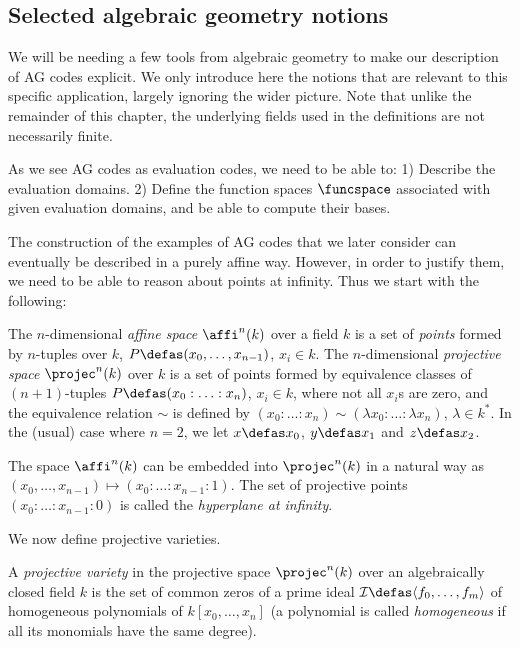 \subsection{Selected algebraic geometry notions}

We will be needing a few tools from algebraic geometry to make our description of AG codes explicit. We only introduce
here the notions that are relevant to this specific application,
largely ignoring the wider picture. Note that unlike the remainder of this chapter, the underlying fields used in the definitions
are not necessarily finite.

As we see AG codes as evaluation codes, we need to be able to: 1) Describe the evaluation domains.
2) Define the function spaces $\funcspace$ associated with given evaluation domains,
and be able to compute their bases.

\medskip

The construction of the examples of AG codes that we later consider can eventually be described in a purely affine way. However, in order to
justify them, we need to be able to reason about points at infinity. Thus we start with the following:

\begin{defi}
\label{def:affiprojec}
The $n$-dimensional \emph{affine space} $\affi^n(k)$ over a field $k$ is a set of \emph{points} formed by $n$-tuples over $k$,
$P \defas (x_0, \ldots, x_{n-1})$, $x_i \in k$.
The $n$-dimensional \emph{projective space} $\projec^n(k)$ over $k$ is a set of points formed by equivalence classes of $(n+1)$-tuples
$P \defas (x_0 : \ldots : x_n)$, $x_i \in k$, where not all $x_i$s are zero, and the equivalence relation $\sim$ is
defined by $(x_0 : \ldots : x_n) \sim (\lambda x_0 : \ldots : \lambda x_n)$, $\lambda \in k^*$. In the (usual) case where $n = 2$, we let
$x \defas x_0$, $y \defas x_1$ and $z \defas x_2$.

\noindent
The space $\affi^n(k)$ can be embedded into $\projec^n(k)$ in a natural way as $(x_0, \ldots, x_{n-1}) \mapsto (x_0 : \ldots : x_{n-1} : 1)$.
The set of projective points $(x_0 : \ldots : x_{n-1} : 0)$ is called the \emph{hyperplane at infinity}.
\end{defi}

We now define projective varieties.

\begin{defi}
A \emph{projective variety} in the projective space $\projec^n(k)$ over an algebraically closed field $k$ is the set of common zeros
of a prime ideal $\mathcal{I} \defas \langle f_0, \ldots, f_m \rangle$ of homogeneous polynomials of $k[x_0,\ldots,x_n]$ (a polynomial is called \emph{homogeneous}
if all its monomials have the same degree).
\end{defi}

